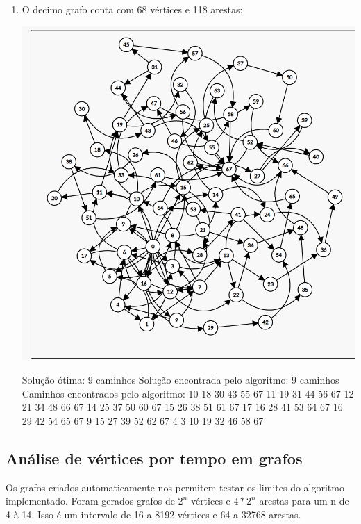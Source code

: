 \begin{enumerate}
    \item O decimo grafo conta com 68 vértices e 118 arestas:
    \begin{center}  
        \includegraphics[scale=0.3]{figuras/G10.png}
    \end{center}
    Solução ótima: 9 caminhos\newline
    Solução encontrada pelo algoritmo: 9 caminhos\newline
    Caminhos encontrados pelo algoritmo: 10 18 30 43 55 67  11 19 31 44 56 67  12 21 34 48 66 67  14 25 37 50 60 67  15 26 38 51 61 67  17 16 28 41 53 64 67  16 29 42 54 65 67  9 15 27 39 52 62 67  4 3 10 19 32 46 58 67 \newline

\end{enumerate}

\subsection{\esp Análise de vértices por tempo em grafos}
 Os grafos criados automaticamente nos permitem testar os limites do algoritmo implementado. Foram
 gerados grafos de $2^n$ vértices e $4*2^n$ arestas para um n de 4 à 14. Isso é um intervalo de 16
 a 8192 vértices e 64 a 32768 arestas.

